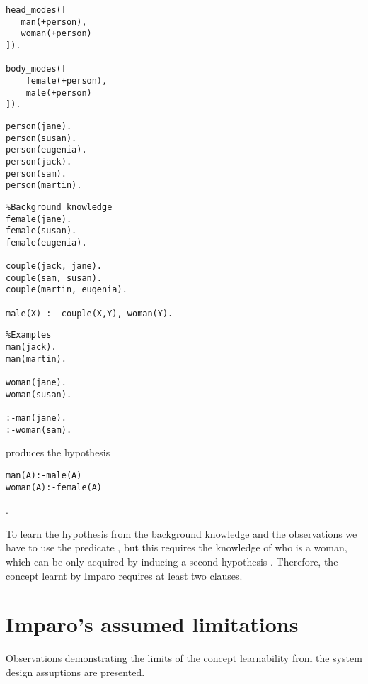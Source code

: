 \begin{minipage}[t]{.26\textwidth}
\begin{lstlisting}
head_modes([
   man(+person),
   woman(+person)
]).

body_modes([
    female(+person),
    male(+person)
]).\end{lstlisting}
\end{minipage}
\begin{minipage}[t]{.22\textwidth}
\begin{lstlisting}
person(jane).
person(susan).
person(eugenia).
person(jack).
person(sam).
person(martin).
\end{lstlisting}
\end{minipage}
\begin{minipage}[t]{.34\textwidth}
\begin{lstlisting}
%Background knowledge
female(jane).
female(susan).
female(eugenia).

couple(jack, jane).
couple(sam, susan).
couple(martin, eugenia).

male(X) :- couple(X,Y), woman(Y).
\end{lstlisting}
\end{minipage}
\begin{minipage}[t]{.20\textwidth}
\begin{lstlisting}
%Examples
man(jack).
man(martin).

woman(jane).
woman(susan).

:-man(jane).
:-woman(sam).
\end{lstlisting}
\end{minipage}

produces the hypothesis
\begin{lstlisting}
man(A):-male(A)
woman(A):-female(A)
\end{lstlisting}.

To learn the hypothesis  from the background knowledge and the observations we have to use the predicate , but this requires the knowledge of who is a woman, which can be only acquired by inducing a second hypothesis . Therefore, the concept learnt by Imparo requires at least two clauses.

\section{Imparo's assumed limitations}
Observations demonstrating the limits of the concept learnability from the system design assuptions are presented.

